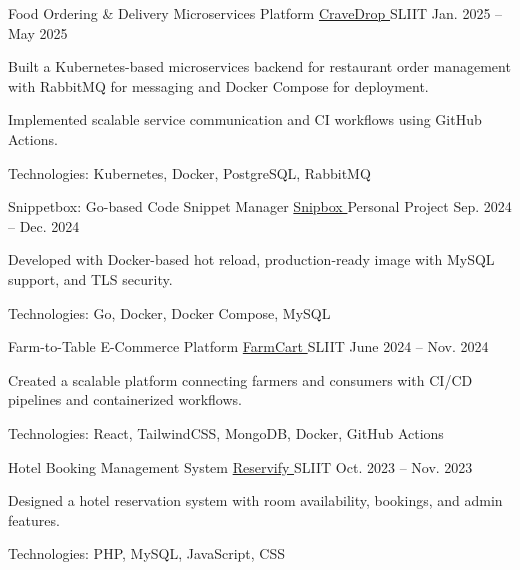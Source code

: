 
\begin{cventries}

  \cventry
    {Food Ordering & Delivery Microservices Platform}
    {\href{https://github.com/nmdra/CraveDrop}{CraveDrop \faGithub}}
    {SLIIT}
    {Jan. 2025 -- May 2025}
    {
      \begin{cvitems}
        \item {Built a Kubernetes-based microservices backend for restaurant order management with RabbitMQ for messaging and Docker Compose for deployment.}
        \item {Implemented scalable service communication and CI workflows using GitHub Actions.}
        \item {Technologies: Kubernetes, Docker, PostgreSQL, RabbitMQ}
      \end{cvitems}
    }

  \cventry
    {Snippetbox: Go-based Code Snippet Manager}
    {\href{https://github.com/nmdra/snipbox}{Snipbox \faGithub}}
    {Personal Project}
    {Sep. 2024 -- Dec. 2024}
    {
      \begin{cvitems}
        \item {Developed with Docker-based hot reload, production-ready image with MySQL support, and TLS security.}
        \item {Technologies: Go, Docker, Docker Compose, MySQL}
      \end{cvitems}
    }

  \cventry
    {Farm-to-Table E-Commerce Platform}
    {\href{https://github.com/nmdra/FarmCart}{FarmCart \faGithub}}
    {SLIIT}
    {June 2024 -- Nov. 2024}
    {
      \begin{cvitems}
        \item {Created a scalable platform connecting farmers and consumers with CI/CD pipelines and containerized workflows.}
        \item {Technologies: React, TailwindCSS, MongoDB, Docker, GitHub Actions}
      \end{cvitems}
    }

  \cventry
    {Hotel Booking Management System}
    {\href{https://github.com/nmdra/Reservify}{Reservify \faGithub}} %
    {SLIIT}
    {Oct. 2023 -- Nov. 2023}
    {
      \begin{cvitems}
        \item {Designed a hotel reservation system with room availability, bookings, and admin features.}
        \item {Technologies: PHP, MySQL, JavaScript, CSS}
      \end{cvitems}
    }


\end{cventries}
